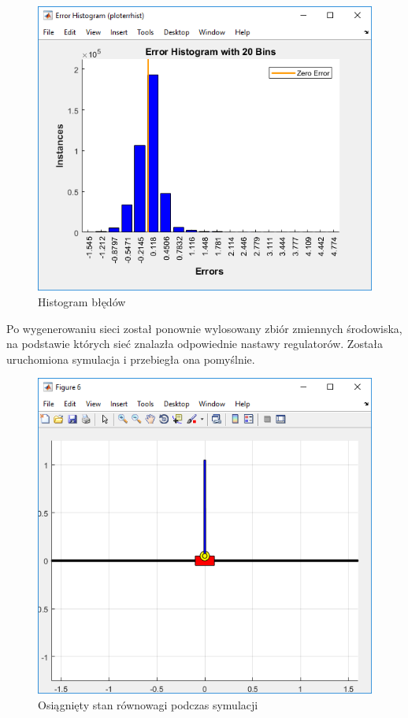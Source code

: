 \documentclass[10pt,a4paper,titlepage]{article}
\begin{document}
	\begin{figure}[H]
		\center
		\includegraphics[width=.88\textwidth]{errhist.png}
		\caption{Histogram błędów}
	\end{figure}
	
	Po wygenerowaniu sieci został ponownie wylosowany zbiór zmiennych środowiska, na podstawie których sieć znalazła odpowiednie nastawy regulatorów. Została uruchomiona symulacja i przebiegła ona pomyślnie.
	
	\begin{figure}[H]
		\center
		\includegraphics[width=\textwidth]{wyniksymulacji1.png}
		\caption{Osiągnięty stan równowagi podczas symulacji}
	\end{figure}
\end{document}

